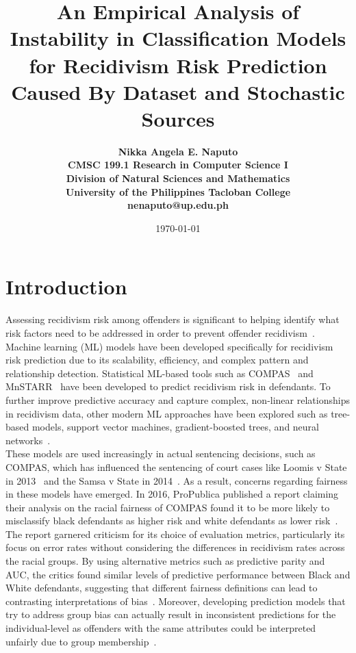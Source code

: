 \documentclass[12pt]{article}
\title{\bfseries An Empirical Analysis of Instability in Classification Models for Recidivism Risk Prediction Caused By Dataset and Stochastic Sources} %
\author{\bfseries 
 Nikka Angela E. Naputo\\
 CMSC 199.1 Research in Computer Science I\\
 Division of Natural Sciences and Mathematics\\
 University of the Philippines Tacloban College\\
 {\small nenaputo@up.edu.ph}
}
\date{\today}
\begin{document}
\sloppy %

\maketitle 
\newpage 

\tableofcontents 
\newpage

\section{Introduction} 
\tab Assessing recidivism risk among offenders is significant to helping identify what risk factors need to be addressed in order to prevent offender recidivism~\cite{bonta2007risk, duwe2017out}. Machine learning (ML) models have been developed specifically for recidivism risk prediction due to its scalability, efficiency, and complex pattern and relationship detection. Statistical ML-based tools such as COMPAS~\cite{northpointe2015practitioner} and MnSTARR~\cite{duwe2014development} have been developed to predict recidivism risk in defendants. To further improve predictive accuracy and capture complex, non-linear relationships in recidivism data, other modern ML approaches have been explored such as tree-based models, support vector machines, gradient-boosted trees, and neural networks~\cite{duwe2017out}.\\

These models are used increasingly in actual sentencing decisions, such as COMPAS, which has influenced the sentencing of court cases like Loomis v State in 2013~\cite{loomis2016} and the Samsa v State in 2014~\cite{samsa2014}. As a result, concerns regarding fairness in these models have emerged. In 2016, ProPublica published a report claiming their analysis on the racial fairness of COMPAS found it to be more likely to misclassify black defendants as higher risk and white defendants as lower risk~\cite{propublica2016analysis}. The report garnered criticism for its choice of evaluation metrics, particularly its focus on error rates without considering the differences in recidivism rates across the racial groups. By using alternative metrics such as predictive parity and AUC, the critics found similar levels of predictive performance between Black and White defendants, suggesting that different fairness definitions can lead to contrasting interpretations of bias~\cite{dieterich2016compas, corbett2017algorithmic, flores2016false}. Moreover, developing prediction models that try to address group bias can actually result in inconsistent predictions for the individual-level as offenders with the same attributes could be interpreted unfairly due to group membership~\cite{greene2022forks, corbett2017algorithmic}. \\
\end{document}
